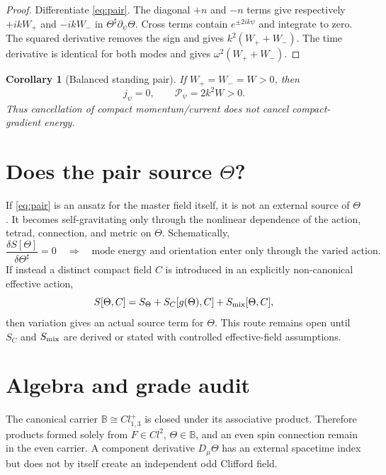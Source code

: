 \documentclass[11pt]{article}
\newtheorem{corollary}{Corollary}
\newcommand{\B}{\mathbb B}
\begin{document}
\begin{proof}
Differentiate \eqref{eq:pair}.  The diagonal \(+n\) and \(-n\) terms give
respectively \(+ikW_+\) and \(-ikW_-\) in
\(\Theta^\sharp\partial_\psi\Theta\).  Cross terms contain
\(e^{\pm2ik\psi}\) and integrate to zero.  The squared derivative removes the
sign and gives \(k^2(W_++W_-)\).  The time derivative is identical for both
modes and gives \(\omega^2(W_++W_-)\).
\end{proof}

\begin{corollary}[Balanced standing pair]
If \(W_+=W_-=W>0\), then
\begin{equation}
 j_\psi=0,
 \qquad
 \mathcal P_\psi=2k^2W>0.
 \label{eq:balanced}
\end{equation}
Thus cancellation of compact momentum/current does not cancel compact-gradient
energy.
\end{corollary}

\section{Does the pair source \(\Theta\)?}
If \eqref{eq:pair} is an ansatz for the master field itself, it is not an
external source of \(\Theta\).  It becomes self-gravitating only through the
nonlinear dependence of the action, tetrad, connection, and metric on
\(\Theta\).  Schematically,
\begin{equation}
 \frac{\delta S[\Theta]}{\delta\Theta^\sharp}=0
 \quad\Longrightarrow\quad
 \text{mode energy and orientation enter only through the varied action}.
\end{equation}
If instead a distinct compact field \(C\) is introduced in an explicitly
non-canonical effective action,
\begin{equation}
 S[\Theta,C]=S_\Theta+S_C[g(\Theta),C]+S_{\rm mix}[\Theta,C],
\end{equation}
then variation gives an actual source term for \(\Theta\).  This route remains
open until \(S_C\) and \(S_{\rm mix}\) are derived or stated with controlled
effective-field assumptions.

\section{Algebra and grade audit}
The canonical carrier \(\B\cong Cl^+_{1,3}\) is closed under its associative
product.  Therefore products formed solely from \(F\in Cl^2\),
\(\Theta\in\B\), and an even spin connection remain in the even carrier.
A component derivative \(D_\mu\Theta\) has an external spacetime index but does
not by itself create an independent odd Clifford field.
\end{document}
